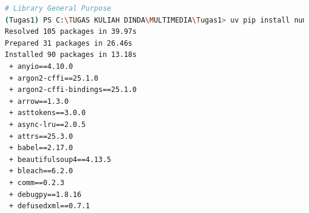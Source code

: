 \documentclass[11pt,a4paper]{article}
\begin{document}
\begin{lstlisting}[language=bash, caption=Instalasi library umum]
# Library General Purpose
(Tugas1) PS C:\TUGAS KULIAH DINDA\MULTIMEDIA\Tugas1> uv pip install numpy pandas jupyter
Resolved 105 packages in 39.97s
Prepared 31 packages in 26.46s
Installed 90 packages in 13.18s
 + anyio==4.10.0                                                                                                                                                                  
 + argon2-cffi==25.1.0                                                                                                                                                            
 + argon2-cffi-bindings==25.1.0                                                                                                                                                   
 + arrow==1.3.0                                                                                                                                                                   
 + asttokens==3.0.0                                                                                                                                                               
 + async-lru==2.0.5                                                                                                                                                               
 + attrs==25.3.0                                                                                                                                                                  
 + babel==2.17.0                                                                                                                                                                  
 + beautifulsoup4==4.13.5                                                                                                                                                         
 + bleach==6.2.0                                                                                                                                                                  
 + comm==0.2.3                                                                                                                                                                    
 + debugpy==1.8.16                                                                                                                                                                
 + defusedxml==0.7.1                                                                                                                                                              

\end{lstlisting}
\end{document}
